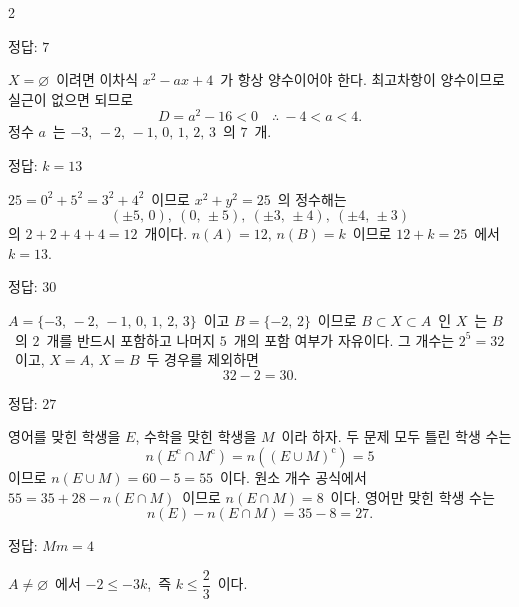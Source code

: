 \documentclass[10pt,fleqn]{article}
\begin{document}
\dmsoltitlefirsttrue
\begin{multicols*}{2}

\begin{dmanswerbox}
정답: $7$
\end{dmanswerbox}

$X=\varnothing$\ 이려면 이차식 $x^{2}-ax+4$\ 가 항상 양수이어야 한다. 최고차항이 양수이므로 실근이 없으면 되므로
\[ D=a^{2}-16<0\quad\therefore\ -4<a<4. \]
정수 $a$\ 는 $-3,\,-2,\,-1,\,0,\,1,\,2,\,3$\ 의 $7$\ 개.

\begin{dmanswerbox}
정답: $k=13$
\end{dmanswerbox}

$25=0^{2}+5^{2}=3^{2}+4^{2}$\ 이므로 $x^{2}+y^{2}=25$\ 의 정수해는
\[ (\pm 5,\,0),\ (0,\,\pm 5),\ (\pm 3,\,\pm 4),\ (\pm 4,\,\pm 3) \]
의 $2+2+4+4=12$\ 개이다. $n(A)=12,\,n(B)=k$\ 이므로 $12+k=25$\ 에서 $k=13$.

\begin{dmanswerbox}
정답: $30$
\end{dmanswerbox}

$A=\{-3,\,-2,\,-1,\,0,\,1,\,2,\,3\}$\ 이고 $B=\{-2,\,2\}$\ 이므로 $B\subset X\subset A$\ 인 $X$\ 는 $B$\ 의 $2$\ 개를 반드시 포함하고 나머지 $5$\ 개의 포함 여부가 자유이다. 그 개수는 $2^{5}=32$\ 이고, $X=A,\,X=B$\ 두 경우를 제외하면
\[ 32-2=30. \]

\begin{dmanswerbox}
정답: $27$
\end{dmanswerbox}

영어를 맞힌 학생을 $E$, 수학을 맞힌 학생을 $M$\ 이라 하자. 두 문제 모두 틀린 학생 수는
\[ n(E^{\mathrm{c}}\cap M^{\mathrm{c}})=n((E\cup M)^{\mathrm{c}})=5 \]
이므로 $n(E\cup M)=60-5=55$\ 이다. 원소 개수 공식에서 $55=35+28-n(E\cap M)$\ 이므로 $n(E\cap M)=8$\ 이다. 영어만 맞힌 학생 수는
\[ n(E)-n(E\cap M)=35-8=27. \]
\begin{dmanswerbox}
정답: $Mm=4$
\end{dmanswerbox}

$A\ne\varnothing$\ 에서 $-2\le -3k$,\ 즉 $k\le\dfrac{2}{3}$\ 이다.


\end{multicols*}
\end{document}

